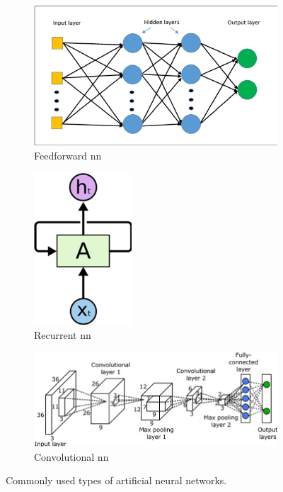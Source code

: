 \documentclass[parskip=half,notes,cadrem,toolver]{iisvlsi}
\begin{document}
\begin{figure}[H]
    \begin{subfigure}[t]{0.33\linewidth}
        \centering
        \includegraphics[width=\textwidth]{figures/ffnn.png}
        \caption{Feedforward \gls{nn}}
        \label{fig:ffnn}
    \end{subfigure}
    \begin{subfigure}[t]{0.33\linewidth}
        \centering
        \includegraphics[width=0.4\textwidth]{figures/recnn.png}
        \caption{Recurrent \gls{nn}}
        \label{fig:recnn}
    \end{subfigure}
    \begin{subfigure}[t]{0.33\linewidth}
        \centering
        \includegraphics[width=\textwidth]{figures/cnn.png}
        \caption{Convolutional \gls{nn}}
        \label{fig:cnn}
    \end{subfigure}
    \caption{Commonly used types of artificial neural networks.}
    \label{fig:nns}
\end{figure}
\end{document}
